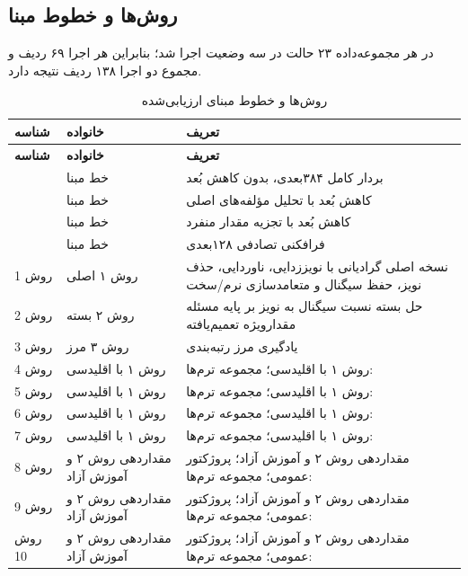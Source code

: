 \documentclass[a4paper,12pt]{article}
\begin{document}
\subsection{روش‌ها و خطوط مبنا}
در هر مجموعه‌داده ۲۳ حالت در سه وضعیت اجرا شد؛ بنابراین هر اجرا ۶۹ ردیف و مجموع دو اجرا ۱۳۸ ردیف نتیجه دارد.

\scriptsize
\begin{longtable}{|C{2.3cm}|C{5.3cm}|C{9.0cm}|}
\caption{روش‌ها و خطوط مبنای ارزیابی‌شده}\label{tab:methods}\\
\hline
\textbf{شناسه} & \textbf{خانواده} & \textbf{تعریف} \\
\hline
\endfirsthead
\hline
\textbf{شناسه} & \textbf{خانواده} & \textbf{تعریف} \\
\hline
\endhead
{} & خط مبنا & بردار کامل ۳۸۴بعدی، بدون کاهش بُعد \\
\hline
{} & خط مبنا & کاهش بُعد با تحلیل مؤلفه‌های اصلی \\
\hline
{} & خط مبنا & کاهش بُعد با تجزیه مقدار منفرد \\
\hline
{} & خط مبنا & فرافکنی تصادفی ۱۲۸بعدی \\
\hline
روش 1 & روش ۱ اصلی & نسخه اصلی گرادیانی با نویززدایی، ناوردایی، حذف نویز، حفظ سیگنال و متعامدسازی نرم/سخت \\
\hline
روش 2 & روش ۲ بسته & حل بسته نسبت سیگنال به نویز بر پایه مسئله مقدارویژه تعمیم‌یافته \\
\hline
روش 3 & روش ۳ مرز  & یادگیری مرز رتبه‌بندی  \\
\hline
روش 4 & روش ۱ با  اقلیدسی & روش ۱ با  اقلیدسی؛ مجموعه ترم‌ها:  \\
\hline
روش 5 & روش ۱ با  اقلیدسی & روش ۱ با  اقلیدسی؛ مجموعه ترم‌ها:  \\
\hline
روش 6 & روش ۱ با  اقلیدسی & روش ۱ با  اقلیدسی؛ مجموعه ترم‌ها:  \\
\hline
روش 7 & روش ۱ با  اقلیدسی & روش ۱ با  اقلیدسی؛ مجموعه ترم‌ها:  \\
\hline
روش 8 & مقداردهی روش ۲ و آموزش آزاد & مقداردهی روش ۲ و آموزش آزاد؛ پروژکتور عمومی؛ مجموعه ترم‌ها:  \\
\hline
روش 9 & مقداردهی روش ۲ و آموزش آزاد & مقداردهی روش ۲ و آموزش آزاد؛ پروژکتور عمومی؛ مجموعه ترم‌ها:  \\
\hline
روش 10 & مقداردهی روش ۲ و آموزش آزاد & مقداردهی روش ۲ و آموزش آزاد؛ پروژکتور عمومی؛ مجموعه ترم‌ها:  \\

\end{longtable}
\end{document}
